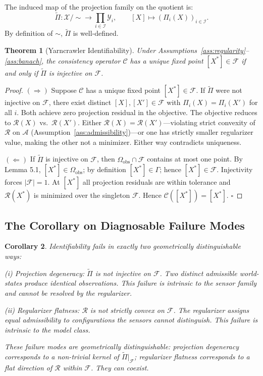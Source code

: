 \documentclass[12pt, oneside]{article}
\newtheorem{theorem}{Theorem}[section]
\newtheorem{corollary}[theorem]{Corollary}
\newcommand{\Xmod}{\mathcal{X}/{\sim}}
\newcommand{\Ftil}{\widetilde{\Pi}}
\begin{document}
The induced map of the projection family on the quotient is:
\[
\Ftil : \Xmod \longrightarrow \prod_{i \in \mathcal{I}} \mathcal{Y}_i, \qquad
[X] \mapsto (\Pi_i(X))_{i \in \mathcal{I}}.
\]
By definition of $\sim$, $\Ftil$ is well-defined.

\begin{theorem}[Yarncrawler Identifiability]
\label{thm:identifiability}
Under Assumptions~\ref{ass:regularity}--\ref{ass:banach}, the consistency operator
$\mathcal{C}$ has a unique fixed point $[X^*] \in \mathcal{F}$ if and only if $\Ftil$
is injective on $\mathcal{F}$.
\end{theorem}

\begin{proof}
$(\Rightarrow)$ Suppose $\mathcal{C}$ has a unique fixed point $[X^*] \in \mathcal{F}$.
If $\Ftil$ were not injective on $\mathcal{F}$, there exist distinct $[X],[X'] \in \mathcal{F}$
with $\Pi_i(X) = \Pi_i(X')$ for all $i$. Both achieve zero projection residual in the
objective. The objective reduces to $\mathcal{R}(X)$ vs.\ $\mathcal{R}(X')$. Either
$\mathcal{R}(X) = \mathcal{R}(X')$---violating strict convexity of $\mathcal{R}$ on
$\mathcal{A}$ (Assumption~\ref{ass:admissibility})---or one has strictly smaller
regularizer value, making the other not a minimizer. Either way contradicts uniqueness.

$(\Leftarrow)$ If $\Ftil$ is injective on $\mathcal{F}$, then $\Omega_{\mathrm{obs}} \cap
\mathcal{F}$ contains at most one point. By Lemma 5.1, $[X^*] \in \Omega_{\mathrm{obs}}$;
by definition $[X^*] \in \Gamma$; hence $[X^*] \in \mathcal{F}$. Injectivity forces
$|\mathcal{F}| = 1$. At $[X^*]$ all projection residuals are within tolerance and
$\mathcal{R}(X^*)$ is minimized over the singleton $\mathcal{F}$. Hence
$\mathcal{C}([X^*]) = [X^*]$. $\square$
\end{proof}

\subsection{The Corollary on Diagnosable Failure Modes}

\begin{corollary}
\label{cor:failures}
Identifiability fails in exactly two geometrically distinguishable ways:

\emph{(i) Projection degeneracy}: $\Ftil$ is not injective on $\mathcal{F}$. Two distinct
admissible world-states produce identical observations. This failure is intrinsic to the
sensor family and cannot be resolved by the regularizer.

\emph{(ii) Regularizer flatness}: $\mathcal{R}$ is not strictly convex on $\mathcal{F}$.
The regularizer assigns equal admissibility to configurations the sensors cannot
distinguish. This failure is intrinsic to the model class.

These failure modes are geometrically distinguishable: projection degeneracy corresponds
to a non-trivial kernel of $\Ftil|_{\mathcal{F}}$; regularizer flatness corresponds to a
flat direction of $\mathcal{R}$ within $\mathcal{F}$. They can coexist.
\end{corollary}
\end{document}
